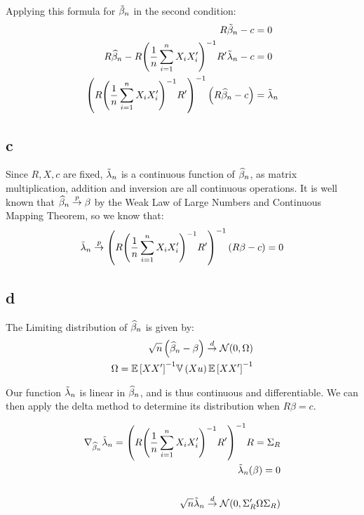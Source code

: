 \documentclass[12pt]{paper}
\begin{document}
Applying this formula for $\tilde{ \beta }_{n}$ in the second condition:
\begin{align*}
  R \tilde{ \beta }_{n} - c &= 0\\
  R \widehat{ \beta }_{n} - R {\left( \frac{1}{n} \sum_{i=1}^n X_i X_i'  \right)}^{-1}
  R' \tilde{ \lambda }_{n} - c &= 0\\
   { \left( R { \left( \frac{1}{n} \sum_{i=1}^n X_i
               X_i' \right)}^{-1} R' \right)}^{-1} \left(  R \widehat{ \beta }_{n} - c \right)
               &= \tilde{ \lambda }_{n}
\end{align*}


\subsection*{c}

Since $R,X,c$ are fixed, $\tilde{ \lambda }_{n}$ is a continuous function of
$\widehat{ \beta }_{n}$, as matrix multiplication, addition and inversion are all
continuous operations. It is well known that $\widehat{ \beta }_{n} \overset{p}{\to} \beta$ by the
Weak Law of Large Numbers and Continuous Mapping Theorem, so we know
that:
\begin{equation*}
  \tilde{ \lambda }_{n} \overset{p}{\to} { \left( R { \left( \frac{1}{n} \sum_{i=1}^n X_i
               X_i' \right)}^{-1} R' \right)}^{-1} \left(  R \beta - c \right) = 0
\end{equation*}

\subsection*{d}

The Limiting distribution of $\widehat{ \beta }_{n}$ is given by:
\begin{align*}
  \sqrt{n} \left(  \widehat{ \beta }_{n} - \beta \right) \overset{d}{\to} \mathcal{N}( 0, \Omega)\\
  \Omega = {\mathbb{E} \left [ XX' \right ]}^{-1} \mathbb{V} \left ( X u \right ) {\mathbb{E} \left [ XX' \right ]}^{-1}\\
\end{align*}

Our function $\tilde{ \lambda }_{n}$ is linear in $\widehat{ \beta }_{n}$, and is thus
continuous and differentiable. We can then apply the delta method to
determine its distribution when $R \beta = c$.

\begin{align*}
  \nabla_{\widehat{ \beta }_{n}} \tilde{ \lambda }_{n} = { \left( R { \left( \frac{1}{n} \sum_{i=1}^n X_i
  X_i' \right)}^{-1} R' \right)}^{-1} R = \Sigma_R\\
  \tilde{ \lambda }_{n}(\beta) = 0\\
  \\
  \sqrt{n} \tilde{ \lambda }_{n} \overset{d}{\to} \mathcal{N}( 0, \Sigma_R' \Omega \Sigma_R)
\end{align*}
\end{document}
